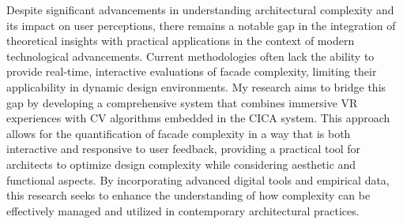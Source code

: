 Despite significant advancements in understanding architectural complexity and its impact on user perceptions, there remains a notable gap in the integration of theoretical insights with practical applications in the context of modern technological advancements.
Current methodologies often lack the ability to provide real-time, interactive evaluations of facade complexity, limiting their applicability in dynamic design environments.
My research aims to bridge this gap by developing a comprehensive system that combines immersive VR experiences with CV algorithms embedded in the CICA system.
This approach allows for the quantification of facade complexity in a way that is both interactive and responsive to user feedback, providing a practical tool for architects to optimize design complexity while considering aesthetic and functional aspects.
By incorporating advanced digital tools and empirical data, this research seeks to enhance the understanding of how complexity can be effectively managed and utilized in contemporary architectural practices.

